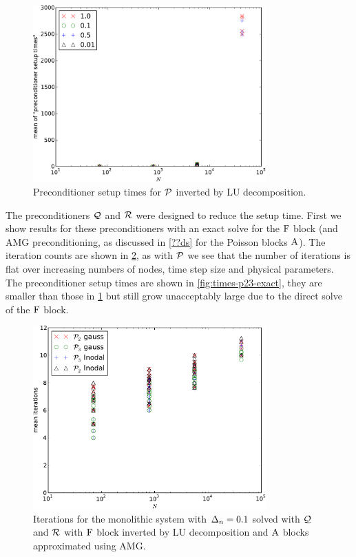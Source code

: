 \begin{figure}
  \centering
  \includegraphics[width=0.8\textwidth]{plots/linear_solvers/som-main-exactimplicitdummy-meanofpreconditionersetuptimesvsinitialnnode.pdf}
  \caption{Preconditioner setup times for $\mathcal{P}$ inverted by LU decomposition.}
  \label{fig:times-p1-exact}
\end{figure}

The preconditioners $\mathcal{Q}$ and $\mathcal{R}$ were designed to reduce the setup time.
First we show results for these preconditioners with an exact solve for the $\mathrm{F}$ block (and AMG preconditioning, as discussed in \cref{??ds} for the Poisson blocks $\mathrm{A}$).
The iteration counts are shown in \cref{fig:its-p23-exact}, as with $\mathcal{P}$ we see that the number of iterations is flat over increasing numbers of nodes, time step size and physical parameters.
The preconditioner setup times are shown in \cref{fig:times-p23-exact}, they are smaller than those in \cref{fig:times-p1-exact} but still grow unacceptably large due to the direct solve of the $\mathrm{F}$ block. 

\begin{figure}
  \centering
  \includegraphics[width=0.8\textwidth]{plots/linear_solvers_p2p3/implicitexact-meanofnsolveritersvsinitialnnode.pdf}
  \caption{Iterations for the monolithic system with $\Delta_{n}=0.1$ solved with $\mathcal{Q}$ and $\mathcal{R}$ with $\mathrm{F}$ block inverted by LU decomposition and $\mathrm{A}$ blocks approximated using AMG.}
  \label{fig:its-p23-exact}
\end{figure}

